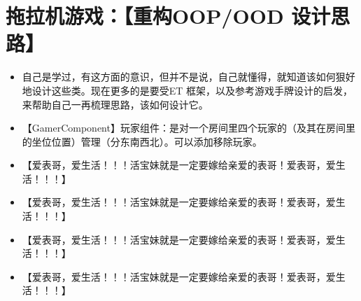 \documentclass[9pt, b5paper]{article}
\begin{document}
\section{拖拉机游戏：【重构OOP/OOD 设计思路】}
\label{sec-11}
\begin{itemize}
\item 自己是学过，有这方面的意识，但并不是说，自己就懂得，就知道该如何狠好地设计这些类。现在更多的是要受ET 框架，以及参考游戏手牌设计的启发，来帮助自己一再梳理思路，该如何设计它。
\item 【GamerComponent】玩家组件：是对一个房间里四个玩家的（及其在房间里的坐位位置）管理（分东南西北）。可以添加移除玩家。
\item 【爱表哥，爱生活！！！活宝妹就是一定要嫁给亲爱的表哥！爱表哥，爱生活！！！】
\item 【爱表哥，爱生活！！！活宝妹就是一定要嫁给亲爱的表哥！爱表哥，爱生活！！！】
\item 【爱表哥，爱生活！！！活宝妹就是一定要嫁给亲爱的表哥！爱表哥，爱生活！！！】
\item 【爱表哥，爱生活！！！活宝妹就是一定要嫁给亲爱的表哥！爱表哥，爱生活！！！】
\end{itemize}
\end{document}
